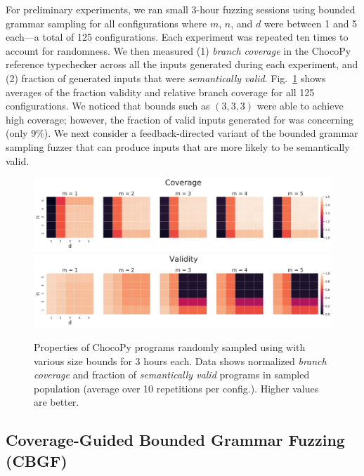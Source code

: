 \documentclass[conference]{IEEEtran}
\begin{document}
For preliminary experiments, we ran small 3-hour fuzzing sessions using bounded grammar sampling for all configurations where $m$, $n$, and $d$ were between 1 and 5 each---a total of 125 configurations. Each experiment was repeated ten times to account for randomness. We then measured (1) \emph{branch coverage} in the ChocoPy reference typechecker across all the inputs generated during each experiment, and (2) fraction of generated inputs that were \emph{semantically valid}. Fig.~\ref{fig:chocopy-heatmaps} shows averages of the fraction validity and relative branch coverage for all 125 configurations. We noticed that bounds such as $(3, 3, 3)$ were able to achieve high coverage; however, the fraction of valid inputs generated for  was concerning (only 9\%). We next consider a feedback-directed variant of the bounded grammar sampling fuzzer that can produce inputs that are more likely to be semantically valid.




\begin{figure}[t]
    \includegraphics[scale=0.42]{total_cov_heatmaps_row_normalized.pdf}
    \includegraphics[scale=0.42]{validity_heatmaps_row.pdf}
    \caption{Properties of ChocoPy programs randomly sampled using  with various size bounds for 3 hours each. Data shows normalized \emph{branch coverage} and fraction of \emph{semantically valid} programs in sampled population (average over 10 repetitions per config.). Higher values are better.}
    \label{fig:chocopy-heatmaps}
\end{figure}








\subsection{Coverage-Guided Bounded Grammar Fuzzing (CBGF)}
\label{sec:cbgf}
\end{document}
